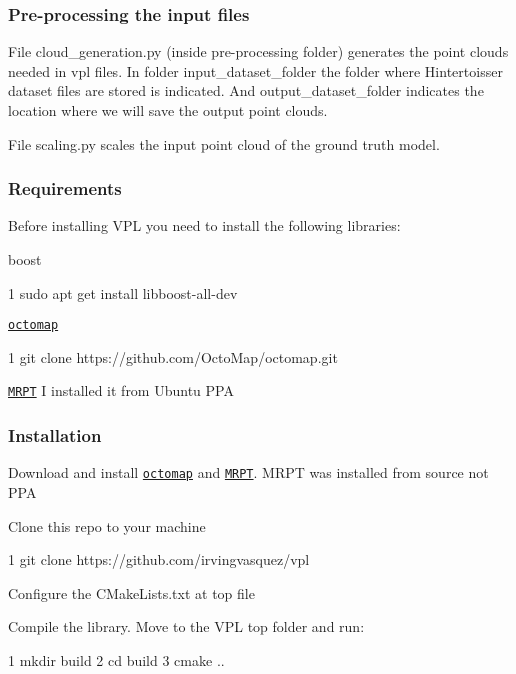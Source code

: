 \subsubsection*{Pre-\/processing the input files}


\begin{DoxyItemize}
\item File {\ttfamily cloud\+\_\+generation.\+py} (inside pre-\/processing folder) generates the point clouds needed in vpl files. In folder {\ttfamily input\+\_\+dataset\+\_\+folder} the folder where Hintertoisser dataset files are stored is indicated. And {\ttfamily output\+\_\+dataset\+\_\+folder} indicates the location where we will save the output point clouds.
\item File {\ttfamily scaling.\+py} scales the input point cloud of the ground truth model.
\end{DoxyItemize}

\subsubsection*{Requirements}

Before installing V\+PL you need to install the following libraries\+:
\begin{DoxyItemize}
\item boost 
\begin{DoxyCode}
1 sudo apt get install libboost-all-dev
\end{DoxyCode}

\item \href{https://octomap.github.io/>}{\tt octomap} 
\begin{DoxyCode}
1 git clone https://github.com/OctoMap/octomap.git
\end{DoxyCode}

\item \href{http://www.mrpt.org/>}{\tt M\+R\+PT} I installed it from Ubuntu P\+PA
\end{DoxyItemize}

\subsubsection*{Installation}


\begin{DoxyEnumerate}
\item Download and install \href{https://octomap.github.io/>}{\tt octomap} and \href{http://www.mrpt.org/>}{\tt M\+R\+PT}. M\+R\+PT was installed from source not P\+PA
\item Clone this repo to your machine 
\begin{DoxyCode}
1 git clone https://github.com/irvingvasquez/vpl
\end{DoxyCode}

\item Configure the C\+Make\+Lists.\+txt at top file
\item Compile the library. Move to the V\+PL top folder and run\+: 
\begin{DoxyCode}
1 mkdir build
2 cd build 
3 cmake ..
\end{DoxyCode}

\end{DoxyEnumerate}

